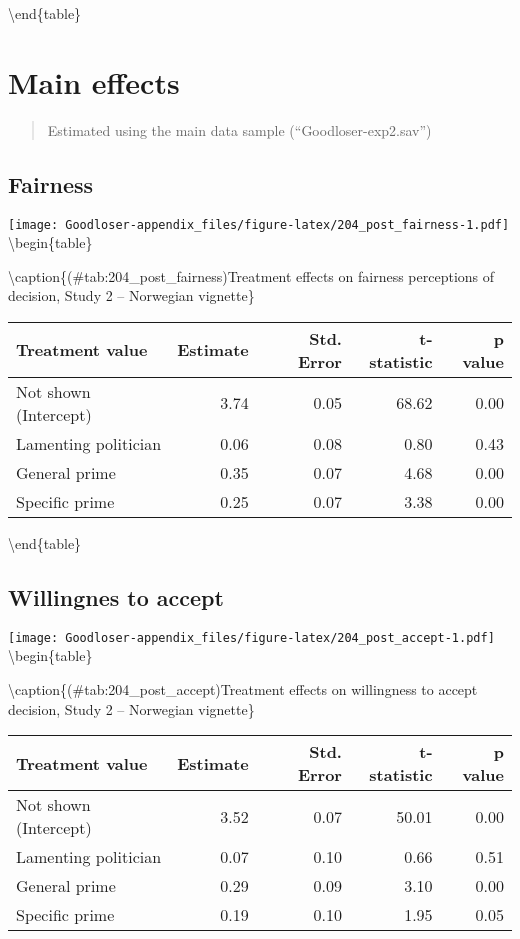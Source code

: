 \documentclass[
]{book}
\begin{document}
\textbackslash end\{table\}

\hypertarget{main-effects-1}{%
\chapter{Main effects}\label{main-effects-1}}

\begin{quote}
Estimated using the main data sample (``Goodloser-exp2.sav'')
\end{quote}

\hypertarget{fairness-2}{%
\section{Fairness}\label{fairness-2}}

\texttt{[image: Goodloser-appendix\_files/figure-latex/204\_post\_fairness-1.pdf]} \textbackslash begin\{table\}

\textbackslash caption\{(\#tab:204\_post\_fairness)Treatment effects on fairness perceptions of decision, Study 2 -- Norwegian vignette\}
\centering

\begin{tabular}[t]{lrrrr}
\toprule
Treatment value & Estimate & Std. Error & t-statistic & p value\\
\midrule
Not shown (Intercept) & 3.74 & 0.05 & 68.62 & 0.00\\
Lamenting politician & 0.06 & 0.08 & 0.80 & 0.43\\
General prime & 0.35 & 0.07 & 4.68 & 0.00\\
Specific prime & 0.25 & 0.07 & 3.38 & 0.00\\
\bottomrule
\end{tabular}

\textbackslash end\{table\}

\hypertarget{willingnes-to-accept}{%
\section{Willingnes to accept}\label{willingnes-to-accept}}

\texttt{[image: Goodloser-appendix\_files/figure-latex/204\_post\_accept-1.pdf]} \textbackslash begin\{table\}

\textbackslash caption\{(\#tab:204\_post\_accept)Treatment effects on willingness to accept decision, Study 2 -- Norwegian vignette\}
\centering

\begin{tabular}[t]{lrrrr}
\toprule
Treatment value & Estimate & Std. Error & t-statistic & p value\\
\midrule
Not shown (Intercept) & 3.52 & 0.07 & 50.01 & 0.00\\
Lamenting politician & 0.07 & 0.10 & 0.66 & 0.51\\
General prime & 0.29 & 0.09 & 3.10 & 0.00\\
Specific prime & 0.19 & 0.10 & 1.95 & 0.05\\
\bottomrule
\end{tabular}
\end{document}
